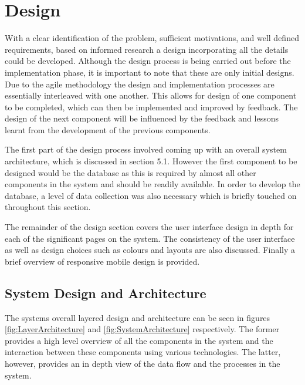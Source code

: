 \chapter{Design}
\label{Chapter:Design}
With a clear identification of the problem, sufficient motivations, and well defined requirements, based on informed research a design incorporating all the details could be developed. Although the design process is being carried out before the implementation phase, it is important to note that these are only initial designs. Due to the agile methodology the design and implementation processes are essentially interleaved with one another. This allows for design of one component to be completed, which can then be implemented and improved by feedback. The design of the next component will be influenced by the feedback and lessons learnt from the development of the previous components.

The first part of the design process involved coming up with an overall system architecture, which is discussed in section 5.1. However the first component to be designed would be the database as this is required by almost all other components in the system and should be readily available. In order to develop the database, a level of data collection was also necessary which is briefly touched on throughout this section.

The remainder of the design section covers the user interface design in depth for each of the significant pages on the system. The consistency of the user interface as well as design choices such as colours and layouts are also discussed. Finally a brief overview of responsive mobile design is provided.

\section{System Design and Architecture}
The systems overall layered design and architecture can be seen in figures \ref{fig:LayerArchitecture} and \ref{fig:SystemArchitecture} respectively. The former provides a high level overview of all the components in the system and the interaction between these components using various technologies. The latter, however, provides an in depth view of the data flow and the processes in the system.

